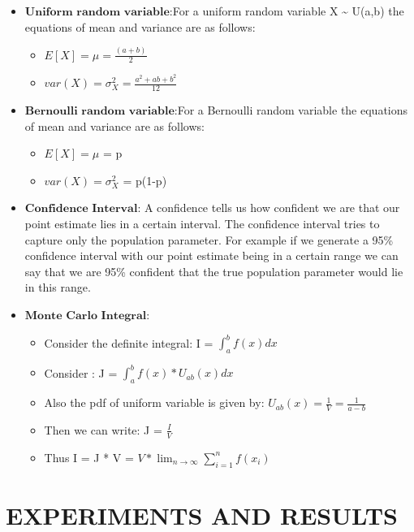 \documentclass[11pt]{article}
\begin{document}
\begin{itemize}
\item
  \(\textbf{Uniform random variable}\):For a uniform random variable X
  \textasciitilde{} U(a,b) the equations of mean and variance are as
  follows:

  \begin{itemize}
  \item
    \(E[X] = \mu = \frac{(a+b)}{2}\)
  \item
    \(var(X) = \sigma_X^2 = \frac{a^2+ab+b^2}{12}\)
  \end{itemize}
\item
  \(\textbf{Bernoulli random variable}\):For a Bernoulli random variable
  the equations of mean and variance are as follows:

  \begin{itemize}
  \item
    \(E[X] = \mu\) = p
  \item
    \(var(X) = \sigma_X^2\) = p(1-p)
  \end{itemize}
\item
  \(\textbf{Confidence Interval}\): A confidence tells us how confident
  we are that our point estimate lies in a certain interval. The
  confidence interval tries to capture only the population parameter.
  For example if we generate a 95\% confidence interval with our point
  estimate being in a certain range we can say that we are 95\%
  confident that the true population parameter would lie in this range.
\item
  \(\textbf{Monte Carlo Integral}\):

  \begin{itemize}
  \item
    Consider the definite integral: I = \(\int_{a}^{b} f(x) dx\)
  \item
    Consider : J = \(\int_{a}^{b} f(x)*U_{ab}(x) dx\)
  \item
    Also the pdf of uniform variable is given by:
    \(U_{ab}(x) = \frac{1}{V} = \frac{1}{a-b}\)
  \item
    Then we can write: J = \(\frac{I}{V}\)
  \item
    Thus I = J * V = \(V * \lim_{n\to\infty} \sum_{i=1}^{n} f(x_i)\)
  \end{itemize}
\end{itemize}

    \section{EXPERIMENTS AND RESULTS}\label{experiments-and-results}
\end{document}
